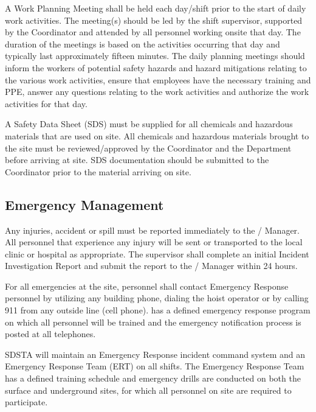 A Work Planning Meeting shall be held each day/shift prior to the
start of daily work activities. The meeting(s) should be led by the
shift supervisor, supported by the   Coordinator and
attended by all personnel working onsite that day. The duration of
the meetings is based on the activities occurring that day and
typically last approximately fifteen minutes. The daily planning
meetings should inform the workers of potential safety hazards and
hazard mitigations relating to the various work activities, ensure
that employees have the necessary  training and PPE, answer any
questions relating to the work activities and authorize the work
activities for that day.

A Safety Data Sheet (SDS) must be supplied for all chemicals and
hazardous materials that are used on site. All chemicals and hazardous
materials brought to the  site must be reviewed/approved by the
  Coordinator and the  
Department before arriving at site.  SDS documentation should be
submitted to the   Coordinator prior to the
material arriving on site.

\subsection{Emergency Management}

Any injuries, accident or spill must be reported immediately to the
/  Manager. All personnel that
experience any injury will be sent or transported to the local clinic
or hospital as appropriate.  The supervisor shall complete an initial
Incident Investigation Report and submit the report to the
/  Manager within 24 hours.

For all emergencies at the  site, personnel shall contact
Emergency Response personnel by utilizing any building phone, dialing
the hoist operator or by calling 911 from any outside line (cell
phone).   has a defined emergency response program on which all
personnel will be trained and the emergency notification process is
posted at all telephones.

SDSTA will maintain an Emergency Response incident command system
and an Emergency Response Team (ERT) on all shifts. The Emergency
Response Team has a defined training schedule and emergency drills are
conducted on both the surface and underground sites, for which all
personnel on site are required to participate.

